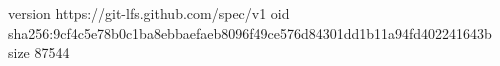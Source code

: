 version https://git-lfs.github.com/spec/v1
oid sha256:9cf4c5e78b0c1ba8ebbaefaeb8096f49ce576d84301dd1b11a94fd402241643b
size 87544
